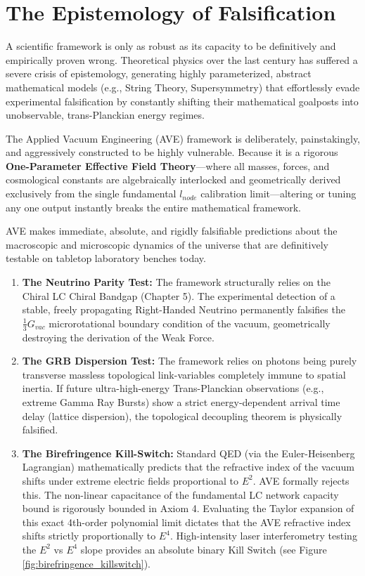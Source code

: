 \section{The Epistemology of Falsification}

A scientific framework is only as robust as its capacity to be definitively and empirically proven wrong. Theoretical physics over the last century has suffered a severe crisis of epistemology, generating highly parameterized, abstract mathematical models (e.g., String Theory, Supersymmetry) that effortlessly evade experimental falsification by constantly shifting their mathematical goalposts into unobservable, trans-Planckian energy regimes.

The Applied Vacuum Engineering (AVE) framework is deliberately, painstakingly, and aggressively constructed to be highly vulnerable. Because it is a rigorous \textbf{One-Parameter Effective Field Theory}—where all masses, forces, and cosmological constants are algebraically interlocked and geometrically derived exclusively from the single fundamental $l_{node}$ calibration limit—altering or tuning any one output instantly breaks the entire mathematical framework. 

AVE makes immediate, absolute, and rigidly falsifiable predictions about the macroscopic and microscopic dynamics of the universe that are definitively testable on tabletop laboratory benches today.

\begin{enumerate}
    \item \textbf{The Neutrino Parity Test:} The framework structurally relies on the Chiral LC Chiral Bandgap (Chapter 5). The experimental detection of a stable, freely propagating Right-Handed Neutrino permanently falsifies the $\frac{1}{3} G_{vac}$ microrotational boundary condition of the vacuum, geometrically destroying the derivation of the Weak Force.
    \item \textbf{The GRB Dispersion Test:} The framework relies on photons being purely transverse massless topological link-variables completely immune to spatial inertia. If future ultra-high-energy Trans-Planckian observations (e.g., extreme Gamma Ray Bursts) show a strict energy-dependent arrival time delay (lattice dispersion), the topological decoupling theorem is physically falsified.
    \item \textbf{The Birefringence Kill-Switch:} Standard QED (via the Euler-Heisenberg Lagrangian) mathematically predicts that the refractive index of the vacuum shifts under extreme electric fields proportional to $E^2$. AVE formally rejects this. The non-linear capacitance of the fundamental LC network capacity bound is rigorously bounded in Axiom 4. Evaluating the Taylor expansion of this exact 4th-order polynomial limit dictates that the AVE refractive index shifts strictly proportionally to \textbf{$E^4$}. High-intensity laser interferometry testing the $E^2$ vs $E^4$ slope provides an absolute binary Kill Switch (see Figure \ref{fig:birefringence_killswitch}).
\end{enumerate}

